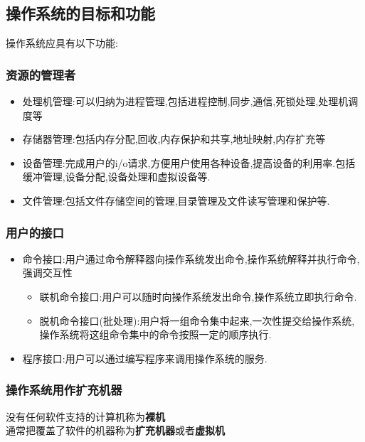 \documentclass{ctexart}
\begin{document}
\subsection{操作系统的目标和功能}
操作系统应具有以下功能:
\subsubsection{资源的管理者}
\begin{itemize}
    \item 处理机管理:可以归纳为进程管理,包括进程控制,同步,通信,死锁处理,处理机调度等
    \item 存储器管理:包括内存分配,回收,内存保护和共享,地址映射,内存扩充等
    \item 设备管理:完成用户的i/o请求,方便用户使用各种设备,提高设备的利用率.包括缓冲管理,设备分配,设备处理和虚拟设备等.
    \item 文件管理:包括文件存储空间的管理,目录管理及文件读写管理和保护等.
\end{itemize}
\subsubsection{用户的接口}
\begin{itemize}
    \item 命令接口:用户通过命令解释器向操作系统发出命令,操作系统解释并执行命令,强调交互性\\
    \begin{itemize}
    \item 联机命令接口:用户可以随时向操作系统发出命令,操作系统立即执行命令.\\
    \item 脱机命令接口(批处理):用户将一组命令集中起来,一次性提交给操作系统,操作系统将这组命令集中的命令按照一定的顺序执行.
    \end{itemize}
    \item 程序接口:用户可以通过编写程序来调用操作系统的服务.
\end{itemize}
\subsubsection{操作系统用作扩充机器}
没有任何软件支持的计算机称为\textbf{裸机}\\
通常把覆盖了软件的机器称为\textbf{扩充机器}或者\textbf{虚拟机}
\end{document}
